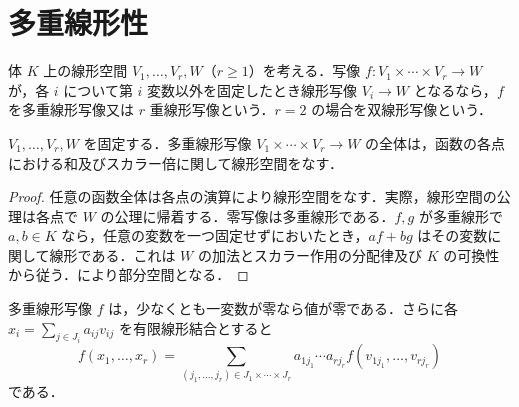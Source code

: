 \section{多重線形性}
\begin{defn}[多重線形写像]
体 $K$ 上の線形空間 $V_1,\ldots,V_r,W$（$r\geq1$）を考える．写像 $f:V_1\times\cdots\times V_r\to W$ が，各 $i$ について第 $i$ 変数以外を固定したとき線形写像 $V_i\to W$ となるなら，$f$ を多重線形写像又は $r$ 重線形写像という．$r=2$ の場合を双線形写像という．
\end{defn}
\begin{prop}[多重線形写像の線形空間]
$V_1,\ldots,V_r,W$ を固定する．多重線形写像 $V_1\times\cdots\times V_r\to W$ の全体は，函数の各点における和及びスカラー倍に関して線形空間をなす．
\end{prop}
\begin{proof}
任意の函数全体は各点の演算により線形空間をなす．実際，線形空間の公理は各点で $W$ の公理に帰着する．零写像は多重線形である．$f,g$ が多重線形で $a,b\in K$ なら，任意の変数を一つ固定せずにおいたとき，$af+bg$ はその変数に関して線形である．これは $W$ の加法とスカラー作用の分配律及び $K$ の可換性から従う．により部分空間となる．
\end{proof}
\begin{prop}[多重線形写像の零成分と展開]
多重線形写像 $f$ は，少なくとも一変数が零なら値が零である．さらに各 $x_i=\sum_{j\in J_i}a_{ij}v_{ij}$ を有限線形結合とすると
\[
 f(x_1,\ldots,x_r)=
 \sum_{(j_1,\ldots,j_r)\in J_1\times\cdots\times J_r}
 a_{1j_1}\cdots a_{rj_r} f(v_{1j_1},\ldots,v_{rj_r})
\]
である．
\end{prop}

